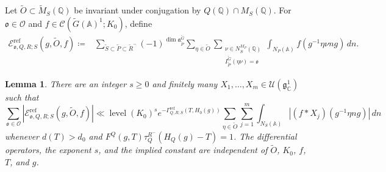 \documentclass[12pt]{amsart}
\theoremstyle{definition}
\theoremstyle{plain}
\newtheorem{lemma}[definition]{Lemma}
\theoremstyle{remark}
\def\C{\mathbb{C}}%
\def\Q{\mathbb{Q}}%
\def\A{\mathbb{A}}%
\newcommand{\fa}{\mathfrak{a}}
\newcommand{\fg}{\mathfrak{g}}
\newcommand{\fo}{\mathfrak{o}}
\newcommand{\cC}{\mathcal{C}}
\newcommand{\cO}{\mathcal{O}}
\newcommand{\cU}{\mathcal{U}}
\numberwithin{equation}{section}
\newcommand{\tG}{\widetilde{G}}
\newcommand{\tM}{\widetilde{M}}
\newcommand{\tP}{\widetilde{P}}
\newcommand{\tR}{\widetilde{R}}
\newcommand{\tS}{\widetilde{S}}
\newcommand{\tO}{\widetilde{O}}
\newcommand{\level}{\operatorname{level}}
\begin{document}
Let $\widetilde O\subset\tM_S(\Q)$ be invariant under
conjugation by $Q(\Q)\cap M_S(\Q)$.
For $\fo\in\cO$ and $f\in\cC(\tG(\A)^1;K_0)$, define
\begin{equation}\label{fg:restricted-sum}
 \begin{split}
 \mathcal E^{\mathrm{ref}}_{\fo,Q,R;S}
       (g,\widetilde O,f)
  \coloneqq {}&\sum_{\tS\subset\tP\subset\tR^-}
        (-1)^{\dim\fa_{\tP}^{\tG}}
       \sum_{\eta\in\widetilde O}
       \sum_{\substack{\nu\in N_S^{M_P}(\Q)\\
               I_{\tP}^{\tG}(\eta\nu)=\fo}}
       \int_{N_P(\A)}f(g^{-1}\eta\nu n g)\,dn .
 \end{split}
\end{equation}

\begin{lemma}\label{fg:restricted-estimate}
There are an integer $s\ge0$ and finitely many
$X_1,\ldots,X_m\in\cU(\fg_\C^1)$ such that
\begin{equation*}
 \sum_{\fo\in\cO}
   |\mathcal E^{\mathrm{ref}}_{\fo,Q,R;S}
          (g,\widetilde O,f)|\ll \level(K_0)^s
 e^{-\Gamma^{\mathrm{ref}}_{Q,R;S}(T,H_0(g))}
 \sum_{\eta\in\widetilde O}\sum_{j=1}^m
       \int_{N_S(\A)}|(f*X_j)(g^{-1}\eta n g)|\,dn
\end{equation*}
whenever $d(T)>d_0$ and
$F^Q(g,T)\tau_Q^{R^-}(H_Q(g)-T)=1$.
The differential operators, the exponent
$s$, and the implied constant are independent of $\tO$, $K_0$, $f$, $T$, and $g$.
\end{lemma}
\end{document}
